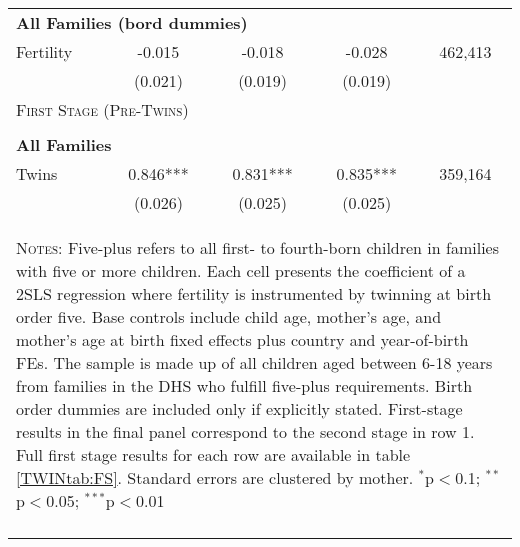 \begin{table}[!htbp]
\begin{tabular}{lcccc}
\multicolumn{5}{l}{\textbf{All Families (bord dummies)}}\\ 
Fertility&-0.015&-0.018&-0.028&462,413\\
         &(0.021)&(0.019)&(0.019)&\\
\midrule\multicolumn{5}{l}{\textsc{First Stage (Pre-Twins)}}\\ 
&&&&\\
\multicolumn{5}{l}{\textbf{All Families}}\\ 
Twins&0.846***&0.831***&0.835***&359,164\\
         &(0.026)&(0.025)&(0.025)&\\
\hline\multicolumn{5}{p{10cm}}{\begin{footnotesize}\textsc{Notes:} Five-plus refers to all first- to fourth-born children in families with five or more children.  Each cell presents the coefficient of a 2SLS regression where fertility is instrumented by twinning at birth order five.  Base controls include child age, mother's age, and mother's age at birth fixed effects plus country and year-of-birth FEs.  The sample is made up of all children aged between 6-18 years from families in the DHS who fulfill five-plus requirements. Birth order dummies are included only if explicitly stated.  First-stage results in the final panel correspond to the second stage in row 1.  Full first stage results for each row are available in table \ref{TWINtab:FS}. Standard errors are clustered by mother. 
$^{*}$p$<$0.1; $^{**}$p$<$0.05; $^{***}$p$<$0.01\end{footnotesize}}
\\\bottomrule\normalsize\end{tabular}\end{table} 
